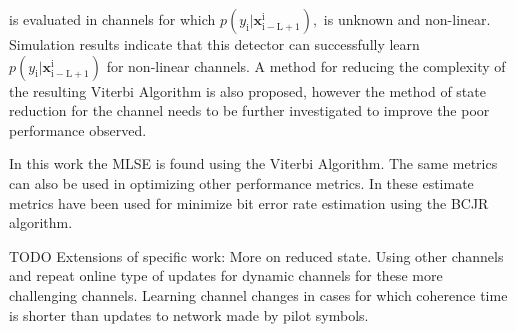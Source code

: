  is evaluated in channels for which $p(y_{\mathrm{i}}|\mathbf{x}_{\mathrm{i-L+1}}^{\mathrm{i}}),$ is unknown and non-linear. Simulation results indicate that this detector can successfully learn
$p(y_{\mathrm{i}}|\mathbf{x}_{\mathrm{i-L+1}}^{\mathrm{i}})$ for non-linear channels. A method for reducing the complexity of the resulting Viterbi Algorithm is also proposed, however the method of state reduction for the channel needs to be further investigated to improve the poor performance observed. 
\par 
In this work the MLSE is found using the Viterbi Algorithm. The same metrics can also be used in optimizing other performance metrics. In \cite{shlezinger2020datadriven} these estimate metrics have been used for minimize bit error rate estimation using the BCJR algorithm. 

TODO Extensions of specific work: 
More on reduced state.
Using other channels and repeat online type of updates for dynamic channels for these more challenging channels. 
Learning channel changes in cases for which coherence time is shorter than updates to network made by pilot symbols. 

